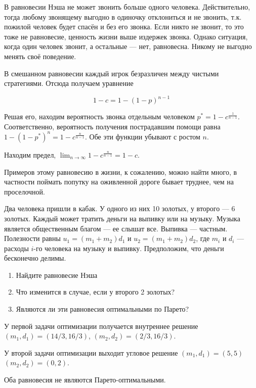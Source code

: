 \begin{solution}
В равновесии Нэша не может звонить больше одного человека. Действительно, тогда любому звонящему выгодно в одиночку отклониться и не звонить, т.к. пожилой человек будет спасён и без его звонка. Если никто не звонит, то это тоже не равновесие, ценность жизни выше издержек звонка. Однако ситуация, когда один человек звонит, а остальные --- нет, равновесна. Никому не выгодно менять своё поведение.

В смешанном равновесии каждый игрок безразличен между чистыми стратегиями. Отсюда получаем уравнение

\[
1-c=1-(1-p)^{n-1}
\]

Решая его, находим вероятность звонка отдельным человеком $p^*=1-c^{\frac{1}{n-1}}$. Соответственно, вероятность получения пострадавшим помощи равна $1-(1-p^*)^n=1-c^{\frac{n}{n-1}}$. Обе эти функции убывают с ростом $n$.

Находим предел, $\lim_{n\to\infty} 1-c^{\frac{n}{n-1}} = 1-c$.

Примеров этому равновесию в жизни, к сожалению, можно найти много, в частности поймать попутку на оживленной дороге бывает труднее, чем на проселочной.

\end{solution}

\begin{problem} 
Два человека пришли в кабак. У одного из них 10 золотых, у второго --- 6 золотых. Каждый может тратить деньги на выпивку или на музыку.
Музыка является общественным благом --- ее слышат все. Выпивка --- частным. Полезности равны $u_{1}=(m_{1}+m_{2})d_{1}$ и
$u_{2}=(m_{1}+m_{2})d_{2}$, где $m_{i}$ и $d_{i}$ --- расходы $i$-го
человека на музыку и выпивку. Предположим, что деньги бесконечно
делимы. 
\begin{enumerate}
\item Найдите равновесие Нэша 
\item Что изменится в случае, если у второго 2 золотых? 
\item Являются ли эти равновесия оптимальными по Парето? 
\end{enumerate}
\end{problem}


\begin{solution}
У первой задачи оптимизации получается внутреннее решение $(m_1,d_1)=(14/3,16/3)$, $(m_2,d_2)=(2/3,16/3)$. 

У второй задачи оптимизации выходит угловое решение $(m_1,d_1)=(5,5)$ $(m_2,d_2)=(0,2)$.

Оба равновесия не являются Парето-оптимальными.
\end{solution}


